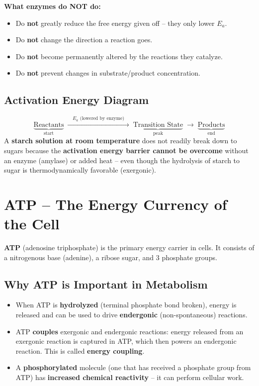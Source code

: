 \documentclass[11pt, letterpaper]{article}
\begin{document}
\begin{tcolorbox}[colback=part4bg, colframe=sectionorange, arc=3pt, boxrule=1pt]
\textbf{What enzymes do NOT do:}
\begin{itemize}[noitemsep, leftmargin=*]
  \item Do \textbf{not} greatly reduce the free energy given off -- they only lower $E_a$.
  \item Do \textbf{not} change the direction a reaction goes.
  \item Do \textbf{not} become permanently altered by the reactions they catalyze.
  \item Do \textbf{not} prevent changes in substrate/product concentration.
\end{itemize}
\end{tcolorbox}

\subsection*{Activation Energy Diagram}
\[
\underbrace{\text{Reactants}}_{\text{start}} \;\xrightarrow{\quad E_a \text{ (lowered by enzyme)}\quad}\; \underbrace{\text{Transition State}}_{\text{peak}} \;\longrightarrow\; \underbrace{\text{Products}}_{\text{end}}
\]
A \textbf{starch solution at room temperature} does not readily break down to sugars because the \textbf{activation energy barrier cannot be overcome} without an enzyme (amylase) or added heat -- even though the hydrolysis of starch to sugar is thermodynamically favorable (exergonic).

\section*{ATP -- The Energy Currency of the Cell}

\textbf{ATP} (adenosine triphosphate) is the primary energy carrier in cells. It consists of a nitrogenous base (adenine), a ribose sugar, and 3 phosphate groups.

\subsection*{Why ATP is Important in Metabolism}
\begin{itemize}[noitemsep]
  \item When ATP is \textbf{hydrolyzed} (terminal phosphate bond broken), energy is released and can be used to drive \textbf{endergonic} (non-spontaneous) reactions.
  \item ATP \textbf{couples} exergonic and endergonic reactions: energy released from an exergonic reaction is captured in ATP, which then powers an endergonic reaction. This is called \textbf{energy coupling}.
  \item A \textbf{phosphorylated} molecule (one that has received a phosphate group from ATP) has \textbf{increased chemical reactivity} -- it can perform cellular work.
\end{itemize}
\end{document}
